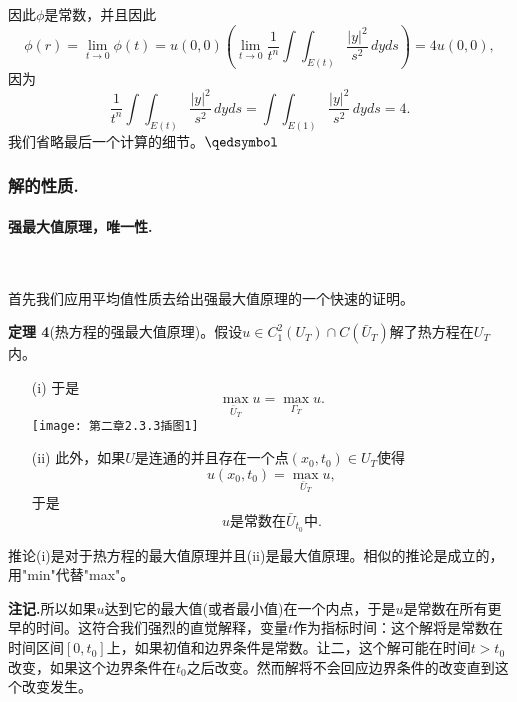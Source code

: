 \documentclass[leqno]{article}
\numberwithin{equation}{subsection}%
\begin{document}
因此$\phi$是常数，并且因此
\begin{equation*}
\phi(r)=\lim_{t\rightarrow 0}\phi(t)=u(0,0)(\lim_{t\rightarrow 0}\frac{1}{t^{n}}\int\!\int_{E(t)}\frac{|y|^{2}}{s^{2}}\,dyds)=4u(0,0),
\end{equation*}
因为
\begin{equation*}
\frac{1}{t^{n}}\int\!\int_{E(t)}\frac{|y|^{2}}{s^{2}}\,dyds=\int\!\int_{E(1)}\frac{|y|^{2}}{s^{2}}\,dyds=4.
\end{equation*}
我们省略最后一个计算的细节。$\hfill\qedsymbol$

\subsubsection{解的性质.}

\paragraph{强最大值原理，唯一性.}~{}
\par
首先我们应用平均值性质去给出强最大值原理的一个快速的证明。
\par
\noindent\textbf{定理 4}(热方程的强最大值原理)。假设$u\in C_{1}^{2}(U_{T})\cap C(\bar{U}_{T})$解了热方程在$U_{T}$内。
\begin{enumerate}
	\item[(i)]于是
	\begin{equation*}
	\max_{\bar{U}_{T}}u=\max_{\Gamma_{T}}u.
	\end{equation*} 
	\texttt{[image: 第二章2.3.3插图1]}
	\item[(ii)]此外，如果$U$是连通的并且存在一个点$(x_{0},t_{0})\in U_{T}$使得
	\begin{equation*}
	u(x_{0},t_{0})=\max_{\bar{U}_{T}} u,
	\end{equation*}
	于是
	\begin{equation*}
	u\text{是常数在}\bar{U}_{t_{0}}\text{中}.
	\end{equation*}
\end{enumerate}
\par
推论(i)是对于热方程的最大值原理并且(ii)是最大值原理。相似的推论是成立的，用"min"代替"max"。
\par
\noindent\textbf{注记.}所以如果$u$达到它的最大值(或者最小值)在一个内点，于是$u$是常数在所有更早的时间。这符合我们强烈的直觉解释，变量$t$作为指标时间：这个解将是常数在时间区间$[0,t_{0}]$上，如果初值和边界条件是常数。让二，这个解可能在时间$t>t_{0}$改变，如果这个边界条件在$t_{0}$之后改变。然而解将不会回应边界条件的改变直到这个改变发生。
\end{document}

